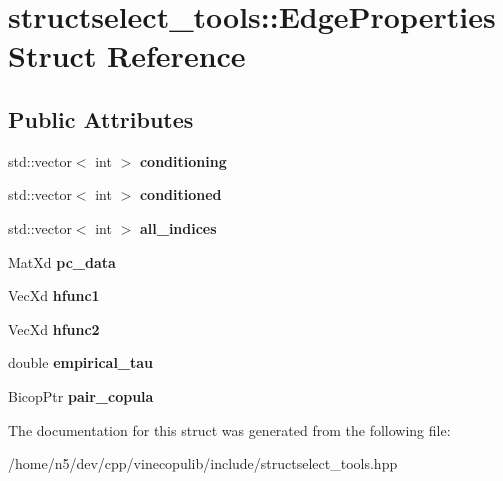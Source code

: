 \hypertarget{structstructselect__tools_1_1_edge_properties}{}\section{structselect\+\_\+tools\+:\+:Edge\+Properties Struct Reference}
\label{structstructselect__tools_1_1_edge_properties}
\subsection*{Public Attributes}
\begin{DoxyCompactItemize}
\item 
std\+::vector$<$ int $>$ {\bfseries conditioning}\hypertarget{structstructselect__tools_1_1_edge_properties_a9f1c09d462b487e2cb45bbe6fa2f6368}{}\label{structstructselect__tools_1_1_edge_properties_a9f1c09d462b487e2cb45bbe6fa2f6368}

\item 
std\+::vector$<$ int $>$ {\bfseries conditioned}\hypertarget{structstructselect__tools_1_1_edge_properties_a1b0d50e8466ddc845c726a50ae16ebea}{}\label{structstructselect__tools_1_1_edge_properties_a1b0d50e8466ddc845c726a50ae16ebea}

\item 
std\+::vector$<$ int $>$ {\bfseries all\+\_\+indices}\hypertarget{structstructselect__tools_1_1_edge_properties_a702ffe89a46787f06659890db25a0611}{}\label{structstructselect__tools_1_1_edge_properties_a702ffe89a46787f06659890db25a0611}

\item 
Mat\+Xd {\bfseries pc\+\_\+data}\hypertarget{structstructselect__tools_1_1_edge_properties_a65df14de91b2be8d9a1492791e6b65bc}{}\label{structstructselect__tools_1_1_edge_properties_a65df14de91b2be8d9a1492791e6b65bc}

\item 
Vec\+Xd {\bfseries hfunc1}\hypertarget{structstructselect__tools_1_1_edge_properties_adc800b6e2bb72a0a68b4675a7daeda96}{}\label{structstructselect__tools_1_1_edge_properties_adc800b6e2bb72a0a68b4675a7daeda96}

\item 
Vec\+Xd {\bfseries hfunc2}\hypertarget{structstructselect__tools_1_1_edge_properties_a951d87593c49216772be6f5a6f7baf9c}{}\label{structstructselect__tools_1_1_edge_properties_a951d87593c49216772be6f5a6f7baf9c}

\item 
double {\bfseries empirical\+\_\+tau}\hypertarget{structstructselect__tools_1_1_edge_properties_a24eb86105437d0a61b63dbe26d08d579}{}\label{structstructselect__tools_1_1_edge_properties_a24eb86105437d0a61b63dbe26d08d579}

\item 
Bicop\+Ptr {\bfseries pair\+\_\+copula}\hypertarget{structstructselect__tools_1_1_edge_properties_a6bfce8ceccc789baad98184646a40c17}{}\label{structstructselect__tools_1_1_edge_properties_a6bfce8ceccc789baad98184646a40c17}

\end{DoxyCompactItemize}


The documentation for this struct was generated from the following file\+:\begin{DoxyCompactItemize}
\item 
/home/n5/dev/cpp/vinecopulib/include/structselect\+\_\+tools.\+hpp\end{DoxyCompactItemize}
